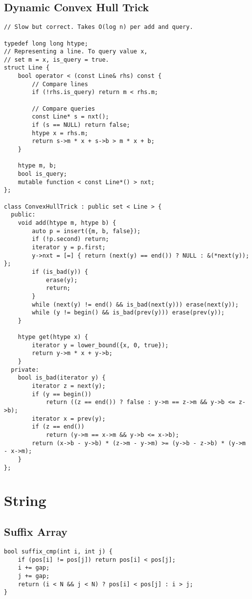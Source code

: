 \documentclass[10pt,landscape]{article}
\begin{document}
\begin{multicols}{2}
\subsection{Dynamic Convex Hull Trick}
\begin{lstlisting}
// Slow but correct. Takes O(log n) per add and query.

typedef long long htype;
// Representing a line. To query value x,
// set m = x, is_query = true.
struct Line {
    bool operator < (const Line& rhs) const {
        // Compare lines
        if (!rhs.is_query) return m < rhs.m;

        // Compare queries
        const Line* s = nxt();
        if (s == NULL) return false;
        htype x = rhs.m;
        return s->m * x + s->b > m * x + b;
    }

    htype m, b;
    bool is_query;
    mutable function < const Line*() > nxt;
};

class ConvexHullTrick : public set < Line > {
  public:
    void add(htype m, htype b) {
        auto p = insert({m, b, false});
        if (!p.second) return;
        iterator y = p.first;
        y->nxt = [=] { return (next(y) == end()) ? NULL : &(*next(y)); };
        if (is_bad(y)) {
            erase(y);
            return;
        }
        while (next(y) != end() && is_bad(next(y))) erase(next(y));
        while (y != begin() && is_bad(prev(y))) erase(prev(y));
    }

    htype get(htype x) {
        iterator y = lower_bound({x, 0, true});
        return y->m * x + y->b;
    }
  private:
    bool is_bad(iterator y) {
        iterator z = next(y);
        if (y == begin())
            return ((z == end()) ? false : y->m == z->m && y->b <= z->b);
        iterator x = prev(y);
        if (z == end())
            return (y->m == x->m && y->b <= x->b);
        return (x->b - y->b) * (z->m - y->m) >= (y->b - z->b) * (y->m - x->m);
    }
};
\end{lstlisting}
\section{String}
\subsection{Suffix Array}
\begin{lstlisting}
bool suffix_cmp(int i, int j) {
    if (pos[i] != pos[j]) return pos[i] < pos[j];
    i += gap;
    j += gap;
    return (i < N && j < N) ? pos[i] < pos[j] : i > j;
}


\end{lstlisting}
\end{multicols}
\end{document}
